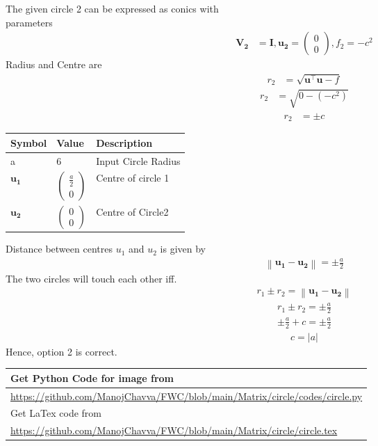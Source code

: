 \documentclass[journal,12pt,twocolumn]{IEEEtran}
\providecommand{\norm}[1]{\left\lVert#1\right\rVert}
\let\vec\mathbf
\newcommand{\myvec}[1]{\ensuremath{\begin{pmatrix}#1\end{pmatrix}}}
\begin{document}
\noindent The given circle 2 can be expressed as conics with \\parameters
    \begin{align}
	\vec{V_2} &= \vec{I}, \vec{u_2} = \myvec{0 \\0}, f_2 = -c^2
	\end{align}
	Radius and Centre are
	\begin{align}
	r_2 &=\sqrt{{\vec{u}^{\top}\vec{u}}-f }
    \end{align}
    \begin{align}
	r_2 &=\sqrt{{0}-(-c^2) }
    \end{align}
    \begin{align}
	r_2 &=\pm c 
    \end{align}


\begin{table}[h]
\centering
\large
\begin{tabular}{|l|l|l|}
\hline
\textbf{Symbol} & \textbf{Value} & \textbf{Description} \\ \hline
a               & 6         &  Input Circle Radius             \\ \hline
$\vec{u_1}$              & $\myvec{\frac{a}{2} \\ 0}$         &  Centre of circle 1             \\ \hline
$\vec{u_2}$             & $\myvec{0\\0}$       & Centre of Circle2             \\ \hline

\end{tabular}
\end{table}

\noindent Distance between centres $u_1$ and $u_2 $ is given by
\begin{align}
\norm{\vec{u_1}-\vec{u_2}}= \pm \frac{a}{2}
\end{align}
 \noindent The two circles will touch each other iff.
 \begin{align}
r_1 \pm r_2 = \norm{\vec{u_1}-\vec{u_2}}
\end{align}
\begin{align}
r_1 \pm r_2 = \pm \frac{a}{2}
\end{align}
\begin{align}
\pm \frac{a}{2} +c = \pm \frac{a}{2}
\end{align}
\begin{align}
c = |a|
\end{align}
Hence, option 2 is correct.
\begin{table}[h]
\large
\begin{tabular}{lll}
\multicolumn{3}{l}{Get Python Code for image from}                                                 \\ \hline
\multicolumn{3}{|l|}{\url{https://github.com/ManojChavva/FWC/blob/main/Matrix/circle/codes/circle.py}} \\ 
 \hline
\multicolumn{3}{l}{Get LaTex code from}                                                            \\ \hline
\multicolumn{3}{|l|}{\url{https://github.com/ManojChavva/FWC/blob/main/Matrix/circle/circle.tex}}            \\ \hline
\end{tabular}
\end{table}
\end{document}

